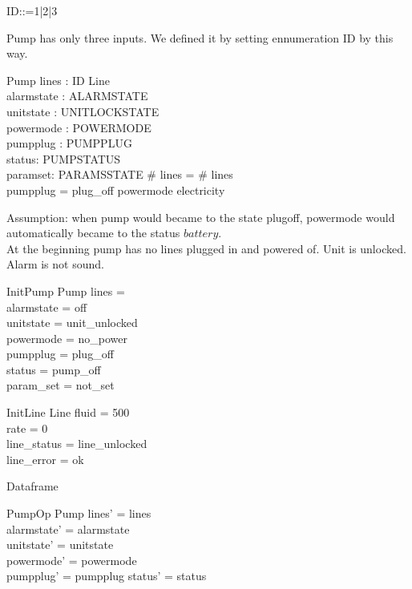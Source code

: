 \documentclass{article}
\begin{document}
	\begin{zed}
		ID::=1|2|3
	\end{zed}
	Pump has only three inputs. We defined it by setting ennumeration ID by this way.	
	\begin{schema}{Pump}
		lines : ID \pfun Line \\
		alarmstate : ALARMSTATE \\
		unitstate : UNITLOCKSTATE \\
		powermode : POWERMODE \\
		pumpplug : PUMPPLUG \\
		status: PUMPSTATUS \\
		paramset: PARAMSSTATE
	\where
		\# \ran lines = \# \dom lines \\
		pumpplug = plug\_off \implies powermode \neq electricity 
	\end{schema}
	
	Assumption: when pump would became to the state plugoff, powermode would automatically became to the status $battery$.\\
	
	At the beginning pump has no lines plugged in and powered of.
	Unit is unlocked. Alarm is not sound. 
		
	
	\begin{schema}{InitPump}
		Pump
		\where
		lines = \emptyset \\
		alarmstate = off \\
		unitstate  = unit\_unlocked \\
		powermode =  no\_power \\
		pumpplug = plug\_off \\
		status = pump\_off\\
		param\_set = not\_set	
	\end{schema}
	
	\begin{schema}{InitLine}
		Line
		\where
		fluid = 500 \\
		rate = 0 \\
		line\_status = line\_unlocked\\
		line\_error = ok \\
	\end{schema}
	
	Dataframe
	\begin{schema}{PumpOp}
		\Delta Pump
	\where
    	lines' = lines  \\
    	alarmstate' = alarmstate \\
    	unitstate' = unitstate \\
    	powermode' = powermode \\
    	pumpplug' = pumpplug
    	status' = status \\
    \end{schema}
	
\end{document}
